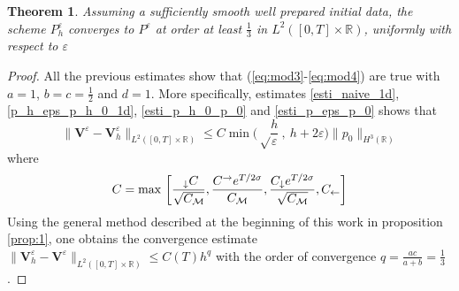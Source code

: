 \documentclass[a4paper,french,english,10pt]{article}
\newcommand\eps{\varepsilon}
\newcommand\V{\mathbf{V}}
\newtheorem{theorem}{Theorem}[section]
\begin{document}
\begin{theorem} \label{theor:1d}
Assuming a sufficiently smooth well prepared initial data,
the scheme $P_h^\eps$ converges to $P^\eps$ at order at least 
$\frac13$ in $L^2([0,T]\times \mathbb{R}   )$, uniformly with respect to $\eps$
\end{theorem}
\begin{proof}
All the previous estimates
show that (\ref{eq:mod3}-\ref{eq:mod4})  are true
with
$a=1$, $b=c=\frac12$ and $d=1$. More specifically, estimates \eqref{esti_naive_1d}, \eqref{p_h_eps_p_h_0_1d}, \eqref{esti_p_h_0_p_0} and \eqref{esti_p_eps_p_0} shows that
\begin{equation*}
\|\V^{\eps}-\V^{\eps}_h \|_{L^2([0,T]\times \mathbb{R})}
\leq C \min\bigg( \sqrt \frac{h}\eps  \: , \:  h + 2 \eps   \bigg) \| p_0 \|_{H^3(\mathbb{R})}
\end{equation*}
where
\begin{equation*}
C =  \hbox{max } \bigg[ \frac{~_\downarrow C }{\sqrt{C_\mathcal M}} ,
\frac{ C^\rightarrow e^{T/2\sigma}}{C_\mathcal M} ,
\frac{    C_\downarrow  e^{T/2\sigma} } {\sqrt{C_\mathcal M}} ,
   C_\leftarrow   \bigg] 
\end{equation*}
Using the general
method described at the beginning of this work in proposition \ref{prop:1}, 
one  obtains the convergence
estimate 
$
\|\mathbf V_h^\eps -\mathbf V^\eps   \|_{L^2([0,T]\times \mathbb{R}   )  }
\leq C(T) h^{ q }
$
with the order of convergence
$
q=\frac{ac}{a+b}=\frac13$.


\end{proof}
\end{document}

